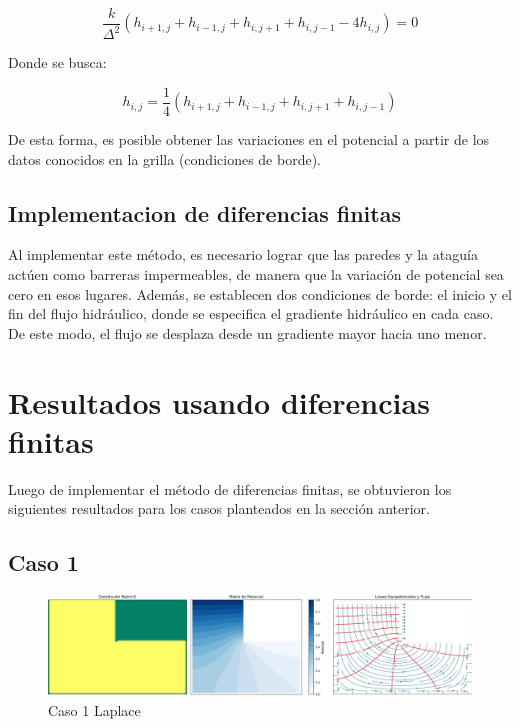 \begin{equation}
    \frac{k}{\Delta^2}(h_{i+1,j} + h_{i-1,j} + h_{i,j+1} + h_{i,j-1} - 4h_{i,j}) = 0
\end{equation}

Donde se busca:

\begin{equation}
    h_{i,j} = \frac{1}{4}(h_{i+1,j} + h_{i-1,j} + h_{i,j+1} + h_{i,j-1})
\end{equation}

De esta forma, es posible obtener las variaciones en el potencial a partir de los datos conocidos en la grilla (condiciones de borde). \citep{budhu_soil_2010}

\subsection{Implementacion de diferencias finitas}

Al implementar este método, es necesario lograr que las paredes y la ataguía actúen como barreras impermeables, de manera que la variación de potencial sea cero en esos lugares. Además, se establecen dos condiciones de borde: el inicio y el fin del flujo hidráulico, donde se especifica el gradiente hidráulico en cada caso. De este modo, el flujo se desplaza desde un gradiente mayor hacia uno menor.


\newpage

\section{Resultados usando diferencias finitas}
Luego de implementar el método de diferencias finitas, se obtuvieron los siguientes resultados para los casos planteados en la sección anterior.
\subsection{Caso 1}

\begin{figure}[H]
    \centering
    \includegraphics[width=\textwidth]{GRAFICOS/laplace_caso_1.jpg}
    \caption{Caso 1 Laplace}
    \label{fig:laplace_caso_1}
\end{figure}

